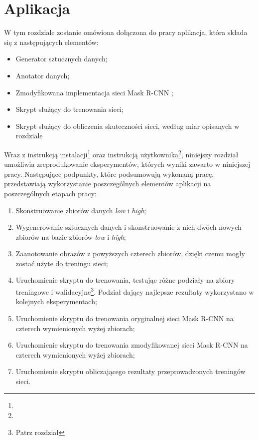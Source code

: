 \chapter{Aplikacja}

W tym rozdziale zostanie omówiona dołączona do pracy aplikacja, która składa się z następujących elementów:
\begin{itemize}
  \item Generator sztucznych danych;
  \item Anotator danych;
  \item Zmodyfikowana implementacja sieci Mask R-CNN \cite{matterport-mask-rcnn};
  \item Skrypt służący do trenowania sieci;
  \item Skrypt służący do obliczenia skuteczności sieci, według miar opisanych w rozdziale 
\end{itemize}

Wraz z instrukcją instalacji\footnote{} oraz instrukcją użytkownika\footnote{}, niniejszy rozdział umożliwia zreprodukowanie eksperymentów, których wyniki zawarto w niniejszej pracy.
Następujące podpunkty, które podsumowują wykonaną pracę, przedstawiają wykorzystanie poszczególnych elementów aplikacji na poszczególnych etapach pracy:

\begin{enumerate}
 \item Skonstruowanie zbiorów danych \textit{low} i \textit{high};
 \item Wygenerowanie sztucznych danych i skonstruowanie z nich dwóch nowych zbiorów na bazie zbiorów \textit{low} i \textit{high};
 \item Zaanotowanie obrazów z powyższych czterech zbiorów, dzięki czemu mogły zostać użyte do treningu sieci;
 \item Uruchomienie skryptu do trenowania, testując różne podziały na zbiory treningowe i walidacyjne\footnote{Patrz rozdział }. Podział dający najlepsze rezultaty wykorzystano w kolejnych eksperymentach;
 \item Uruchomienie skryptu do trenowania oryginalnej sieci Mask R-CNN na czterech wymienionych wyżej zbiorach;
 \item Uruchomienie skryptu do trenowania zmodyfikowanej sieci Mask R-CNN na czterech wymienionych wyżej zbiorach;
 \item Uruchomienie skryptu obliczającego rezultaty przeprowadzonych treningów sieci.
\end{enumerate}



